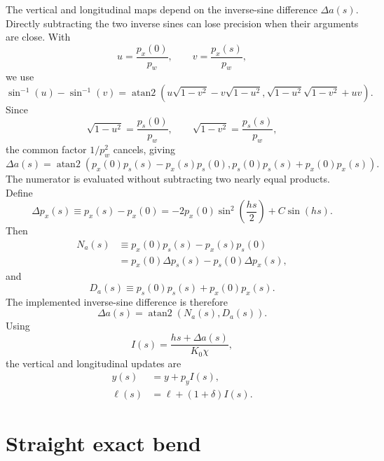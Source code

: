 The vertical and longitudinal maps depend on the inverse-sine difference
\(\Delta a(s)\). Directly subtracting the two inverse sines can lose precision
when their arguments are close. With
\begin{equation}
u=\frac{p_x(0)}{p_w}, \qquad v=\frac{p_x(s)}{p_w},
\end{equation}
we use
\begin{equation}
\sin^{-1}(u)-\sin^{-1}(v)
=
\operatorname{atan2}\left(
u\sqrt{1-v^2}-v\sqrt{1-u^2},
\sqrt{1-u^2}\sqrt{1-v^2}+uv
\right).
\end{equation}
Since
\begin{equation}
\sqrt{1-u^2}=\frac{p_s(0)}{p_w}, \qquad
\sqrt{1-v^2}=\frac{p_s(s)}{p_w},
\end{equation}
the common factor \(1/p_w^2\) cancels, giving
\begin{equation}
\Delta a(s)
=
\operatorname{atan2}
\left(
p_x(0)p_s(s)-p_x(s)p_s(0),
p_s(0)p_s(s)+p_x(0)p_x(s)
\right).
\end{equation}
The numerator is evaluated without subtracting two nearly equal products. Define
\begin{equation}
\Delta p_x(s) \equiv p_x(s)-p_x(0)
=
-2p_x(0)\sin^2\left(\frac{hs}{2}\right)+C\sin(hs).
\end{equation}
Then
\begin{align}
N_a(s)
&\equiv p_x(0)p_s(s)-p_x(s)p_s(0) \\
&= p_x(0)\Delta p_s(s)-p_s(0)\Delta p_x(s),
\end{align}
and
\begin{equation}
D_a(s) \equiv p_s(0)p_s(s)+p_x(0)p_x(s).
\end{equation}
The implemented inverse-sine difference is therefore
\begin{equation}
\Delta a(s)=\operatorname{atan2}\left(N_a(s),D_a(s)\right).
\end{equation}
Using
\begin{equation}
I(s)=\frac{hs+\Delta a(s)}{K_0\chi},
\end{equation}
the vertical and longitudinal updates are
\begin{align}
y(s) &= y + p_y I(s), \\
\ell(s) &= \ell + (1+\delta) I(s).
\end{align}

\section{Straight exact bend}

